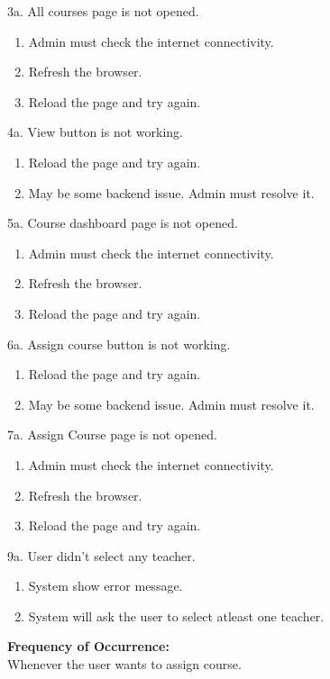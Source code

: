 3a. All courses page is not opened.
\begin{enumerate}
\item Admin must check the internet connectivity.
\item Refresh the browser.
\item Reload the page and try again.
\end{enumerate}
4a. View button is not working.
\begin{enumerate}
\item Reload the page and try again.
\item May be some backend issue. Admin must resolve it.
\end{enumerate}
5a. Course dashboard page is not opened.
\begin{enumerate}
\item Admin must check the internet connectivity.
\item Refresh the browser.
\item Reload the page and try again.
\end{enumerate}
6a. Assign course button is not working.
\begin{enumerate}
\item Reload the page and try again.
\item May be some backend issue. Admin must resolve it.
\end{enumerate}
7a. Assign Course page is not opened.
\begin{enumerate}
\item Admin must check the internet connectivity.
\item Refresh the browser.
\item Reload the page and try again.
\end{enumerate}
9a. User didn't select any teacher.
\begin{enumerate}
\item System show error message.
\item System will ask the user to select atleast one teacher.
\end{enumerate}
\textbf{Frequency of Occurrence:}\\
Whenever the user wants to assign course.



